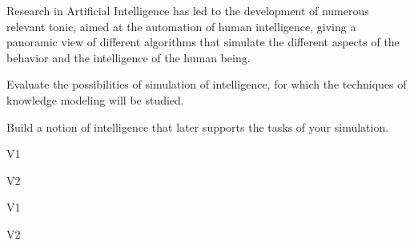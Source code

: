 \begin{syllabus}


\begin{justification}
Research in Artificial Intelligence has led to the development of numerous relevant tonic, aimed at the automation of human intelligence, giving a panoramic view of different
algorithms that simulate the different aspects of the behavior and the intelligence of the human being.
\end{justification}

\begin{goals}
\item Evaluate the possibilities of simulation of intelligence, for which the techniques of knowledge modeling will be studied.
\item Build a notion of intelligence that later supports the tasks of your simulation.
\end{goals}

\begin{outcomes}{V1}
  \item {}
  \item {}
\end{outcomes}

\begin{outcomes}{V2}
  \item {}
  \item {}
\end{outcomes}

\begin{competences}{V1}
    \item {} 
    \item {}
    \item {}
\end{competences}

\begin{competences}{V2}
    \item {} 
    \item {}
    \item {}
\end{competences}


\end{syllabus}
